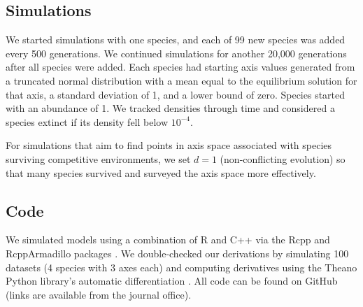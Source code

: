 \subsection*{Simulations}

We started simulations with one species, and each of 99 new species
was added every 500 generations.
We continued simulations for another 20,000 generations after all
species were added.
Each species had starting axis values generated from a truncated normal distribution 
with a mean equal to the equilibrium solution for that axis,
a standard deviation of 1, and a lower bound of zero.
Species started with an abundance of 1.
We tracked densities through time and considered a species extinct if its 
density fell below $10^{-4}$.



For simulations that aim to find points in axis space associated with
species surviving competitive environments, we set $d = 1$ 
(non-conflicting evolution) so that many species
survived and surveyed the axis space more effectively.





\subsection*{Code}

We simulated models using a combination of R \citep{RCoreTeam:2019wf} and
C++ via the Rcpp and RcppArmadillo packages
\citep{Eddelbuettel:2014ad,Eddelbuettel:2013if,Sanderson:2016cs}.
We double-checked our derivations by simulating 100 datasets
(4 species with 3 axes each) and computing derivatives using the Theano Python
library's automatic differentiation \citep{TheanoDevelopmentTeam:2016uc}.
All code can be found on GitHub
(links are available from the journal office).

